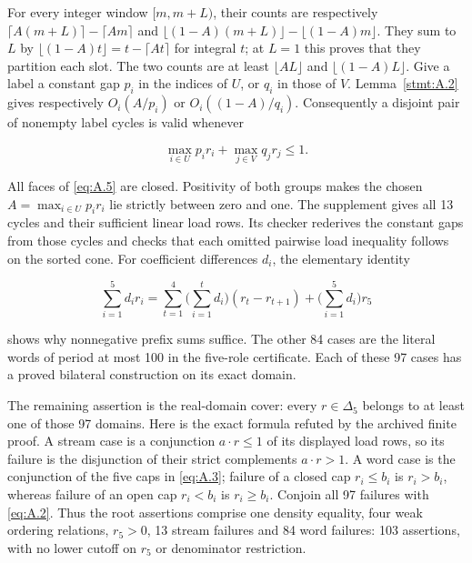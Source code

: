 \documentclass[11pt,a4paper]{article}
\begin{document}
For every integer window \([m,m+L)\), their counts are respectively \(\lceil A(m+L)\rceil-\lceil Am\rceil\) and \(\lfloor(1-A)(m+L)\rfloor-\lfloor(1-A)m\rfloor\). They sum to \(L\) by \(\lfloor(1-A)t\rfloor=t-\lceil At\rceil\) for integral \(t\); at \(L=1\) this proves that they partition each slot. The two counts are at least \(\lfloor AL\rfloor\) and \(\lfloor(1-A)L\rfloor\). Give a label a constant gap \(p_i\) in the indices of \(U\), or \(q_i\) in those of \(V\). Lemma~\ref{stmt:A.2} gives respectively \(O_i(A/p_i)\) or \(O_i((1-A)/q_i)\). Consequently a disjoint pair of nonempty label cycles is valid whenever

\begin{equation}
\max_{i\in U}p_i r_i+\max_{j\in V}q_jr_j\le1.
\tag{A.5}\label{eq:A.5}
\end{equation}

All faces of \eqref{eq:A.5} are closed. Positivity of both groups makes the chosen \(A=\max_{i\in U}p_i r_i\) lie strictly between zero and one. The supplement gives all 13 cycles and their sufficient linear load rows. Its checker rederives the constant gaps from those cycles and checks that each omitted pairwise load inequality follows on the sorted cone. For coefficient differences \(d_i\), the elementary identity

\begin{equation}
\sum_{i=1}^5d_ir_i
=\sum_{t=1}^4\Big(\sum_{i=1}^td_i\Big)(r_t-r_{t+1})
+\Big(\sum_{i=1}^5d_i\Big)r_5
\tag{A.6}\label{eq:A.6}
\end{equation}

shows why nonnegative prefix sums suffice. The other 84 cases are the literal words of period at most 100 in the five-role certificate. Each of these 97 cases has a proved bilateral construction on its exact domain.

The remaining assertion is the real-domain cover: every \(r\in\Delta_5\) belongs to at least one of those 97 domains. Here is the exact formula refuted by the archived finite proof. A stream case is a conjunction \(a\cdot r\le1\) of its displayed load rows, so its failure is the disjunction of their strict complements \(a\cdot r>1\). A word case is the conjunction of the five caps in \eqref{eq:A.3}; failure of a closed cap \(r_i\le b_i\) is \(r_i>b_i\), whereas failure of an open cap \(r_i<b_i\) is \(r_i\ge b_i\). Conjoin all 97 failures with \eqref{eq:A.2}. Thus the root assertions comprise one density equality, four weak ordering relations, \(r_5>0\), 13 stream failures and 84 word failures: 103 assertions, with no lower cutoff on \(r_5\) or denominator restriction.
\end{document}
